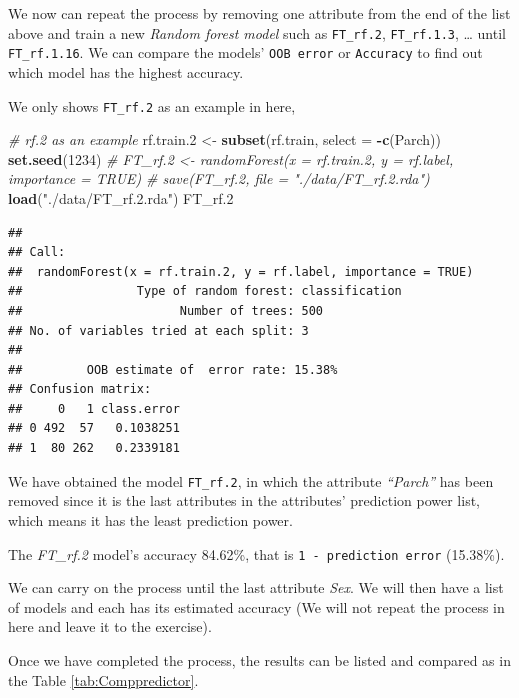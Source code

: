 \documentclass[
]{book}
\newenvironment{Shaded}{\begin{snugshade}}{\end{snugshade}}
\newcommand{\CommentTok}[1]{\textcolor[rgb]{0.56,0.35,0.01}{\textit{#1}}}
\newcommand{\DataTypeTok}[1]{\textcolor[rgb]{0.13,0.29,0.53}{#1}}
\newcommand{\DecValTok}[1]{\textcolor[rgb]{0.00,0.00,0.81}{#1}}
\newcommand{\FloatTok}[1]{\textcolor[rgb]{0.00,0.00,0.81}{#1}}
\newcommand{\KeywordTok}[1]{\textcolor[rgb]{0.13,0.29,0.53}{\textbf{#1}}}
\newcommand{\NormalTok}[1]{#1}
\newcommand{\OperatorTok}[1]{\textcolor[rgb]{0.81,0.36,0.00}{\textbf{#1}}}
\newcommand{\StringTok}[1]{\textcolor[rgb]{0.31,0.60,0.02}{#1}}
\begin{document}
We now can repeat the process by removing one attribute from the end of the list above and train a new \emph{Random forest model} such as \texttt{FT\_rf.2}, \texttt{FT\_rf.1.3}, \ldots{} until \texttt{FT\_rf.1.16}. We can compare the models' \texttt{OOB\ error} or \texttt{Accuracy} to find out which model has the highest accuracy.

We only shows \texttt{FT\_rf.2} as an example in here,

\begin{Shaded}
\begin{Highlighting}[]
\CommentTok{# rf.2 as an example}
\NormalTok{rf.train}\FloatTok{.2}\NormalTok{ <-}\StringTok{ }\KeywordTok{subset}\NormalTok{(rf.train, }\DataTypeTok{select =} \OperatorTok{-}\KeywordTok{c}\NormalTok{(Parch))}
\KeywordTok{set.seed}\NormalTok{(}\DecValTok{1234}\NormalTok{)}
\CommentTok{# FT_rf.2 <- randomForest(x = rf.train.2, y = rf.label, importance = TRUE)}
\CommentTok{# save(FT_rf.2, file = "./data/FT_rf.2.rda")}
\KeywordTok{load}\NormalTok{(}\StringTok{"./data/FT_rf.2.rda"}\NormalTok{)}
\NormalTok{FT_rf}\FloatTok{.2}
\end{Highlighting}
\end{Shaded}

\begin{verbatim}
## 
## Call:
##  randomForest(x = rf.train.2, y = rf.label, importance = TRUE) 
##                Type of random forest: classification
##                      Number of trees: 500
## No. of variables tried at each split: 3
## 
##         OOB estimate of  error rate: 15.38%
## Confusion matrix:
##     0   1 class.error
## 0 492  57   0.1038251
## 1  80 262   0.2339181
\end{verbatim}

We have obtained the model \texttt{FT\_rf.2}, in which the attribute \emph{``Parch''} has been removed since it is the last attributes in the attributes' prediction power list, which means it has the least prediction power.

The \emph{FT\_rf.2} model's accuracy 84.62\%, that is \texttt{1\ -\ prediction\ error} (15.38\%).

We can carry on the process until the last attribute \emph{Sex}. We will then have a list of models and each has its estimated accuracy (We will not repeat the process in here and leave it to the exercise).

Once we have completed the process, the results can be listed and compared as in the Table \ref{tab:Comppredictor}.
\end{document}
